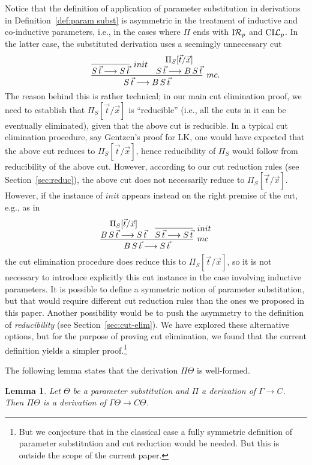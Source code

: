 \documentclass[preprint]{elsarticle}
\newcommand{\Seq}[2]{#1\longrightarrow #2}
\newcommand{\indRP}{{\rm I}{\cal R}_p}
\newcommand{\coindLP}{{\rm CI}{\cal L}_p}
\newtheorem{lemma}[thm]{Lemma}
\begin{document}
\begin{remark}
  Notice that the definition of application of parameter substitution
  in derivations in Definition~\ref{def:param subst} is asymmetric in
  the treatment of inductive and co-inductive parameters, i.e., in the
  cases where $\Pi$ ends with $\indRP$ and $\coindLP$.  In the latter
  case, the substituted derivation uses a seemingly unnecessary cut
$$
\infer[mc.]  {\Seq {S\,\vec t}{B\,S\,\vec t}} { \infer[init] {\Seq
    {S\,\vec t}{S\,\vec t}}{} & \deduce{\Seq {S\,\vec t}{B\,S\,\vec
      t}}{\Pi_S[\vec t/\vec x]} }
$$
The reason behind this is rather technical; in our main cut
elimination proof, we need to establish that $\Pi_S[\vec t/\vec x]$ is
``reducible'' (i.e., all the cuts in it can be eventually eliminated),
given that the above cut is reducible. In a typical cut elimination
procedure, say Gentzen's proof for LK, one would have expected that
the above cut reduces to $\Pi_S[\vec t/\vec x]$, hence reducibility of
$\Pi_S$ would follow from reducibility of the above cut.  However,
according to our cut reduction rules (see Section~\ref{sec:reduc}),
the above cut does not necessarily reduce to $\Pi_S[\vec t/\vec x]$.
However, if the instance of $init$ appears instead on the right
premise of the cut, e.g., as in
$$
\infer[mc] {\Seq {B\,S\,\vec t}{S\,\vec t}} { \deduce{\Seq {B\,S\,\vec
      t}{S\,\vec t}}{\Pi_S[\vec t/\vec x]} & \infer[init] {\Seq
    {S\,\vec t}{S\,\vec t}}{} }
$$
the cut elimination procedure does reduce this to $\Pi_S[\vec t/\vec
x]$, so it is not necessary to introduce explicitly this cut instance
in the case involving inductive parameters.  It is possible to define
a symmetric notion of parameter substitution, but that would require
different cut reduction rules than the ones we proposed in this
paper. Another possibility would be to push the asymmetry to the
definition of \emph{reducibility} (see Section~\ref{sec:cut-elim}). We
have explored these alternative options, but for the purpose of
proving cut elimination, we found that the current definition yields a
simpler proof.\footnote{ But we conjecture that in the classical case
  a fully symmetric definition of parameter substitution and cut
  reduction would be needed. But this is outside the scope of the
  current paper.}
\end{remark}

The following lemma states that the derivation $\Pi\Theta$ is
well-formed.

\begin{lemma}
  \label{lm:param subst}
  Let $\Theta$ be a parameter substitution and $\Pi$  a
  derivation of $\Seq \Gamma C$. Then $\Pi\Theta$ is a derivation of
  $\Seq {\Gamma\Theta}{C\Theta}$.
\end{lemma}
\end{document}
